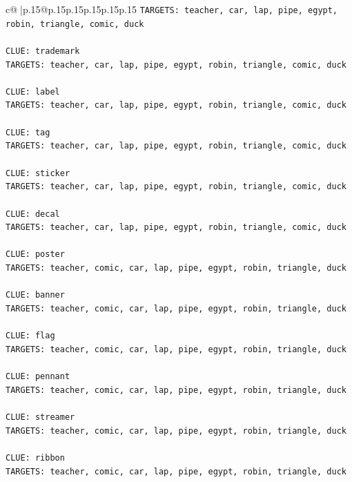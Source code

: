 \documentclass{article}
\begin{document}
{\begin{supertabular}{c@{$\;$}|p{.15\linewidth}@{}p{.15\linewidth}p{.15\linewidth}p{.15\linewidth}p{.15\linewidth}p{.15\linewidth}}
{{{\texttt{TARGETS: teacher, car, lap, pipe, egypt, robin, triangle, comic, duck} \\
\\ 
\texttt{CLUE: trademark} \\
\texttt{TARGETS: teacher, car, lap, pipe, egypt, robin, triangle, comic, duck} \\
\\ 
\texttt{CLUE: label} \\
\texttt{TARGETS: teacher, car, lap, pipe, egypt, robin, triangle, comic, duck} \\
\\ 
\texttt{CLUE: tag} \\
\texttt{TARGETS: teacher, car, lap, pipe, egypt, robin, triangle, comic, duck} \\
\\ 
\texttt{CLUE: sticker} \\
\texttt{TARGETS: teacher, car, lap, pipe, egypt, robin, triangle, comic, duck} \\
\\ 
\texttt{CLUE: decal} \\
\texttt{TARGETS: teacher, car, lap, pipe, egypt, robin, triangle, comic, duck} \\
\\ 
\texttt{CLUE: poster} \\
\texttt{TARGETS: teacher, comic, car, lap, pipe, egypt, robin, triangle, duck} \\
\\ 
\texttt{CLUE: banner} \\
\texttt{TARGETS: teacher, comic, car, lap, pipe, egypt, robin, triangle, duck} \\
\\ 
\texttt{CLUE: flag} \\
\texttt{TARGETS: teacher, comic, car, lap, pipe, egypt, robin, triangle, duck} \\
\\ 
\texttt{CLUE: pennant} \\
\texttt{TARGETS: teacher, comic, car, lap, pipe, egypt, robin, triangle, duck} \\
\\ 
\texttt{CLUE: streamer} \\
\texttt{TARGETS: teacher, comic, car, lap, pipe, egypt, robin, triangle, duck} \\
\\ 
\texttt{CLUE: ribbon} \\
\texttt{TARGETS: teacher, comic, car, lap, pipe, egypt, robin, triangle, duck} \\
}}}
\end{supertabular}}
\end{document}
